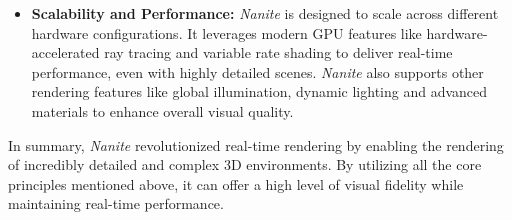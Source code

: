 \documentclass[10pt,journal,compsoc]{IEEEtran}
\begin{document}
\begin{itemize}
        \item \textbf{Scalability and Performance:} \textit{Nanite} is designed to scale across different hardware configurations. It leverages modern GPU features like hardware-accelerated ray tracing and variable rate shading to deliver real-time performance, even with highly detailed scenes. \textit{Nanite} also supports other rendering features like global illumination, dynamic lighting and advanced materials to enhance overall visual quality.
    \end{itemize}

    \par In summary, \textit{Nanite} revolutionized real-time rendering by enabling the rendering of incredibly detailed and complex 3D environments. By utilizing all the core principles mentioned above, it can offer a high level of visual fidelity while maintaining real-time performance. 
    







\end{document}
